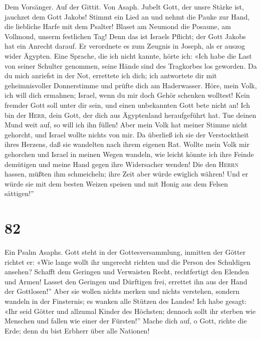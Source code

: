  Dem Vorsänger. Auf der Gittit. Von Asaph. Jubelt Gott,
der unsre Stärke ist, jauchzet dem Gott Jakobs!  Stimmt
ein Lied an und nehmt die Pauke zur Hand, die liebliche Harfe mit dem
Psalter!  Blaset am Neumond die Posaune, am Vollmond,
unserm festlichen Tag!  Denn das ist Israels Pflicht; der
Gott Jakobs hat ein Anrecht darauf.  Er verordnete es zum
Zeugnis in Joseph, als er auszog wider Ägypten.  Eine
Sprache, die ich nicht kannte, hörte ich: «Ich habe die Last von seiner
Schulter genommen, seine Hände sind des Tragkorbes los geworden.
 Da du mich anriefst in der Not, errettete ich dich; ich
antwortete dir mit geheimnisvoller Donnerstimme und prüfte dich am
Haderwasser.  Höre, mein Volk, ich will dich ermahnen;
Israel, wenn du mir doch Gehör schenken wolltest!  Kein
fremder Gott soll unter dir sein, und einen unbekannten Gott bete nicht
an!  Ich bin der \textsc{Herr}, dein Gott, der dich aus
Ägyptenland heraufgeführt hat. Tue deinen Mund weit auf, so will ich ihn
füllen!  Aber mein Volk hat meiner Stimme nicht gehorcht,
und Israel wollte nichts von mir.  Da überließ ich sie
der Verstocktheit ihres Herzens, daß sie wandelten nach ihrem eigenen
Rat.  Wollte mein Volk mir gehorchen und Israel in meinen
Wegen wandeln,  wie leicht könnte ich ihre Feinde
demütigen und meine Hand gegen ihre Widersacher wenden! 
Die den \textsc{Herrn} hassen, müßten ihm schmeicheln; ihre Zeit aber
würde ewiglich währen!  Und er würde sie mit dem besten
Weizen speisen und mit Honig aus dem Felsen sättigen!''

\hypertarget{section-81}{%
\section{82}\label{section-81}}

 Ein Psalm Asaphs. Gott steht in der Gottesversammlung,
inmitten der Götter richtet er:  «Wie lange wollt ihr
ungerecht richten und die Person des Schuldigen ansehen? 
Schafft dem Geringen und Verwaisten Recht, rechtfertigt den Elenden und
Armen!  Lasset den Geringen und Dürftigen frei, errettet
ihn aus der Hand der Gottlosen!''  Aber sie wollen nichts
merken und nichts verstehen, sondern wandeln in der Finsternis; es
wanken alle Stützen des Landes!  Ich habe gesagt: «Ihr
seid Götter und allzumal Kinder des Höchsten;  dennoch
sollt ihr sterben wie Menschen und fallen wie einer der Fürsten!''
 Mache dich auf, o Gott, richte die Erde; denn du bist
Erbherr über alle Nationen!

